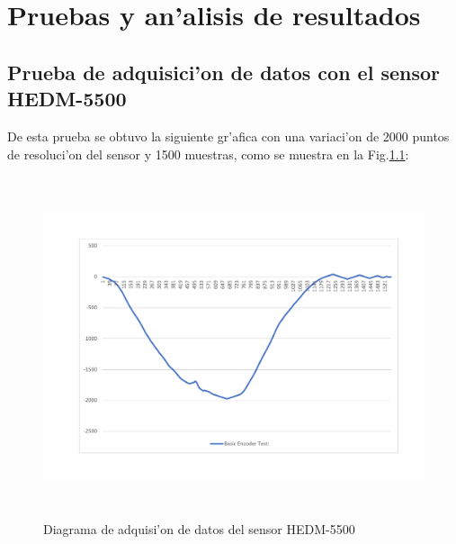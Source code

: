 \chapter{Pruebas y an'alisis de resultados}
\section{Prueba de adquisici'on de datos con el sensor HEDM-5500}
De esta prueba se obtuvo la siguiente gr'afica con una variaci'on de 2000 puntos de resoluci'on del sensor y 1500 muestras, como se muestra en la Fig.\ref{fig:adqsens}:
\setlength{\parskip}{0cm}
\begin{center}
\begin{figure}[ht]
	\centering
		\includegraphics[width=14cm, height=10cm]{pruebasensor}
	\caption{Diagrama de adquisi'on de datos del sensor HEDM-5500}
	\label{fig:adqsens}
\end{figure}
\end{center}
